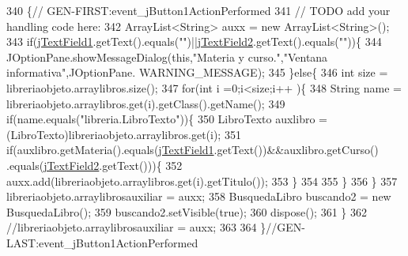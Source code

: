 \begin{DoxyCode}
340                                                                          \{\textcolor{comment}{//
      GEN-FIRST:event\_jButton1ActionPerformed}
341         \textcolor{comment}{// TODO add your handling code here:}
342         ArrayList<String> auxx = \textcolor{keyword}{new} ArrayList<String>();
343         \textcolor{keywordflow}{if}(\mbox{\hyperlink{class_interfaz_package_1_1_consulta_busqueda_a268df17df2147b480825a6af3128683e}{jTextField1}}.getText().equals(\textcolor{stringliteral}{""})||\mbox{\hyperlink{class_interfaz_package_1_1_consulta_busqueda_aa92702c5bdc2128ce8e45ce2edd99543}{jTextField2}}.getText().equals(\textcolor{stringliteral}{""}))\{
344             JOptionPane.showMessageDialog(\textcolor{keyword}{this},\textcolor{stringliteral}{"Materia y curso."},\textcolor{stringliteral}{"Ventana informativa"},JOptionPane.
      WARNING\_MESSAGE);
345         \}\textcolor{keywordflow}{else}\{
346             \textcolor{keywordtype}{int} size = libreriaobjeto.arraylibros.size();
347             \textcolor{keywordflow}{for}(\textcolor{keywordtype}{int} i =0;i<size;i++ )\{
348                 String name = libreriaobjeto.arraylibros.get(i).getClass().getName();
349                 \textcolor{keywordflow}{if}(name.equals(\textcolor{stringliteral}{"libreria.LibroTexto"}))\{
350                      LibroTexto auxlibro = (LibroTexto)libreriaobjeto.arraylibros.get(i);
351                      \textcolor{keywordflow}{if}(auxlibro.getMateria().equals(\mbox{\hyperlink{class_interfaz_package_1_1_consulta_busqueda_a268df17df2147b480825a6af3128683e}{jTextField1}}.getText())&&auxlibro.getCurso()
      .equals(\mbox{\hyperlink{class_interfaz_package_1_1_consulta_busqueda_aa92702c5bdc2128ce8e45ce2edd99543}{jTextField2}}.getText()))\{
352                          auxx.add(libreriaobjeto.arraylibros.get(i).getTitulo());
353                      \}
354                         
355                 \}
356             \}
357             libreriaobjeto.arraylibrosauxiliar = auxx;
358             BusquedaLibro buscando2 = \textcolor{keyword}{new} BusquedaLibro();
359             buscando2.setVisible(\textcolor{keyword}{true});
360             dispose();
361         \}
362         \textcolor{comment}{//libreriaobjeto.arraylibrosauxiliar = auxx;}
363         
364     \}\textcolor{comment}{//GEN-LAST:event\_jButton1ActionPerformed}
\end{DoxyCode}
\mbox{\label{class_interfaz_package_1_1_consulta_busqueda_aefe90b6a93c1980740aba8de6f1f137f}} 
